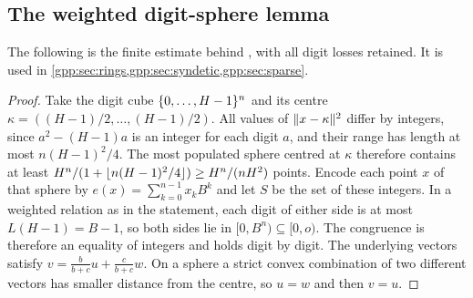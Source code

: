 \subsection{The weighted digit-sphere lemma}\label{gpp:sec:digits}
{\raggedright{}}

The following is the finite estimate behind , with all digit
losses retained. It is used in
\cref{gpp:sec:rings,gpp:sec:syndetic,gpp:sec:sparse}.


\begin{proof}
Take the digit cube $\{0,\ldots,H-1\}^n$ and its centre
$\kappa=((H-1)/2,\ldots,(H-1)/2)$. All values of $\lVert x-\kappa\rVert^2$ differ by integers,
since $a^2-(H-1)a$ is an integer for each digit $a$, and their range has length at most
$n(H-1)^2/4$. The most populated sphere centred at $\kappa$ therefore contains at least
$H^n/(1+\lfloor n(H-1)^2/4\rfloor)\ge H^n/(nH^2)$ points. Encode each point $x$ of that sphere
by $e(x)=\sum_{k=0}^{n-1}x_kB^k$ and let $S$ be the set of these integers. In a weighted
relation as in the statement, each digit of either side is at most $L(H-1)=B-1$, so both
sides lie in $[0,B^n)\subseteq[0,o)$. The congruence is therefore an equality of integers
and holds digit by digit. The underlying vectors satisfy
$v=\frac{b}{b+c}u+\frac{c}{b+c}w$. On a sphere a strict convex combination of two
different vectors has smaller distance from the centre, so $u=w$ and then $v=u$.
\end{proof}


